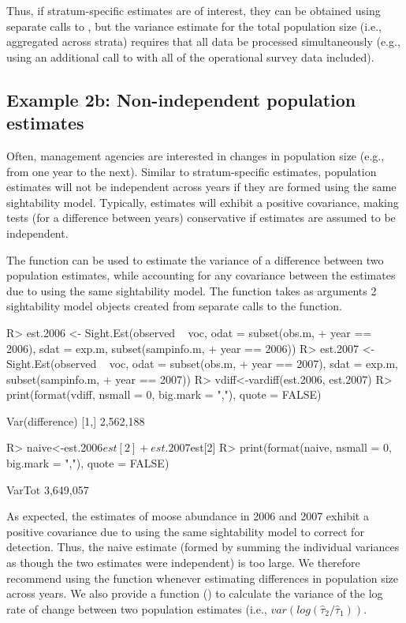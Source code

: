 \documentclass[nojss]{jss}
\begin{document}
Thus, if stratum-specific estimates are of interest, they can be
obtained using separate calls to , but the variance
estimate for the total population size (i.e., aggregated across
strata) requires that all data be processed simultaneously (e.g.,
using an additional call to  with all of the
operational survey data included).

\subsection{Example 2b:  Non-independent population estimates}
Often, management agencies are interested in changes in population
size (e.g., from one year to the next).  Similar to stratum-specific
estimates, population estimates will not be independent across years
if they are formed using the same sightability model. Typically,
estimates will exhibit a positive covariance, making tests (for a
difference between years) conservative if estimates are assumed to
be independent.

The  function can be used to estimate the variance of
a difference between two population estimates, while accounting for
any covariance between the estimates due to using the same
sightability model. The function takes as arguments 2 sightability
model objects created from separate calls to the 
function.
\begin{Schunk}
\begin{Sinput}
R> est.2006 <- Sight.Est(observed ~ voc, odat = subset(obs.m,
+      year == 2006), sdat = exp.m, subset(sampinfo.m,
+      year == 2006))
R> est.2007 <- Sight.Est(observed ~ voc, odat = subset(obs.m,
+      year == 2007), sdat = exp.m, subset(sampinfo.m,
+      year == 2007))
R> vdiff<-vardiff(est.2006, est.2007)
R> print(format(vdiff, nsmall = 0, big.mark = ","), quote = FALSE)
\end{Sinput}
\begin{Soutput}
     Var(difference)
[1,] 2,562,188
\end{Soutput}
\end{Schunk}

\begin{Schunk}
\begin{Sinput}
R> naive<-est.2006$est[2] + est.2007$est[2]
R> print(format(naive, nsmall = 0, big.mark = ","), quote = FALSE)
\end{Sinput}
\begin{Soutput}
   VarTot
3,649,057
\end{Soutput}
\end{Schunk}
As expected, the estimates of moose abundance in 2006 and 2007
exhibit a positive covariance due to using the same sightability
model to correct for detection. Thus, the naive estimate (formed by
summing the individual variances as though the two estimates were
independent) is too large.  We therefore recommend using the
 function whenever estimating differences in
population size across years. We also provide a function
() to calculate the variance of the log rate of
change between two population estimates (i.e.,
$var(log(\hat{\tau}_{2}/\hat{\tau}_{1}))$.
\end{document}
